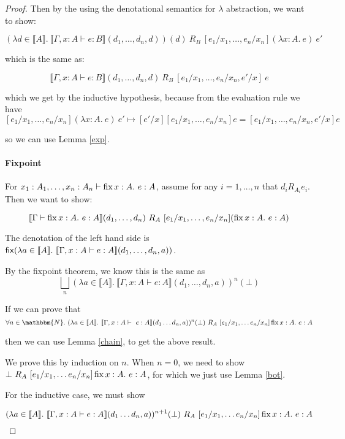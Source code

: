 \begin{proof}
Then by the using the denotational semantics for $\lambda$ abstraction, we want to show:

\[ (\lambda d \in \llbracket A \rrbracket. \ \llbracket \Gamma, x :A \vdash e : B \rrbracket (d_1, \dots, d_n,d))(d) \ R_B \ [e_1/x_1, \dots, e_n/x_n] (\lambda x:A. \ e) \ e'\]

which is the same as:

\[ \llbracket \Gamma, x :A \vdash e : B \rrbracket (d_1, \dots, d_n, d) \ R_B \ [e_1/x_1, \dots, e_n/x_n, e'/x] \ e \]

which we get by the inductive hypothesis, because from the evaluation rule we have \[[e_1/x_1, \dots, e_n/x_n] (\lambda x:A. \ e) \ e'  \mapsto [e'/x][e_1/x_1, \dots, e_n/x_n]e = [e_1/x_1, \dots, e_n/x_n, e'/x]e\]

 so we can use Lemma \ref{exp}. 

\paragraph{Fixpoint}
For $x_1 : A_1, \dots, x_n : A_n \vdash \operatorname{fix} x:A. \ e : A$, assume for any $i = 1, \dots, n$ that $d_i R_{A_i} e_i$. Then we want to show:

\[ \llbracket \Gamma \vdash \operatorname{fix} x:A. \ e : A \rrbracket (d_1, \dots, d_n) \ R_A \ [e_1/x_1, \dots, e_n/x_n] (\operatorname{fix} x:A. \ e : A) \]

The denotation of the left hand side is $\operatorname{\mathsf{fix}}( \lambda a \in \llbracket A \rrbracket. \  \llbracket \Gamma, x :A \vdash e : A \rrbracket(d_1, \dots, d_n, a))$.

By the fixpoint theorem, we know this is the same as 
\[\bigsqcup_n (\lambda a \in \llbracket A \rrbracket. \  \llbracket \Gamma, x :A \vdash e : A \rrbracket(d_1, \dots, d_n, a))^n(\bot)\]


If we can prove that \[\forall n \in \mathbbm{N}. \ (\lambda a \in \llbracket A \rrbracket. \ \llbracket \Gamma, x : A \vdash \ e : A \rrbracket(d_1 \dots d_n, a))^n(\bot) \ R_A \ [e_1/x_1, \dots e_n/x_n]\fix x : A. \ e : A\]

then we can use Lemma \ref{chain}, to get the above result.

We prove this by induction on $n$. When $n = 0$, we need to show $\bot \ R_A \ [e_1/x_1, \dots e_n/x_n]\operatorname{fix} x : A. \ e : A$, for which we just use Lemma \ref{bot}.

For the inductive case, we must show 

\[(\lambda a \in \llbracket A \rrbracket. \ \llbracket \Gamma, x : A \vdash e : A \rrbracket(d_1 \dots d_n,a))^{n+1}(\bot) \ R_A \ [e_1/x_1, \dots e_n/x_n]\operatorname{fix} x : A. \ e : A\]


\end{proof}
